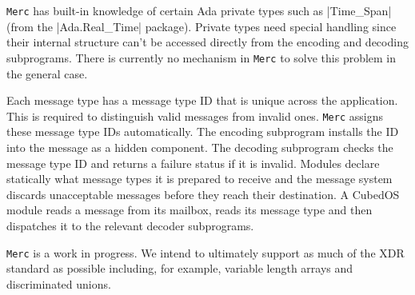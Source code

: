\texttt{Merc} has built-in knowledge of certain Ada private types such as |Time_Span| (from the
|Ada.Real_Time| package). Private types need special handling since their internal structure
can't be accessed directly from the encoding and decoding subprograms. There is currently no
mechanism in \texttt{Merc} to solve this problem in the general case.

Each message type has a message type ID that is unique across the application. This is required
to distinguish valid messages from invalid ones. \texttt{Merc} assigns these message type IDs
automatically. The encoding subprogram installs the ID into the message as a hidden component.
The decoding subprogram checks the message type ID and returns a failure status if it is
invalid. Modules declare statically what message types it is prepared to receive and the message
system discards unacceptable messages before they reach their destination. A CubedOS module
reads a message from its mailbox, reads its message type and then dispatches it to the relevant
decoder subprograms.

\texttt{Merc} is a work in progress. We intend to ultimately support as much of the XDR standard
as possible including, for example, variable length arrays and discriminated unions.
